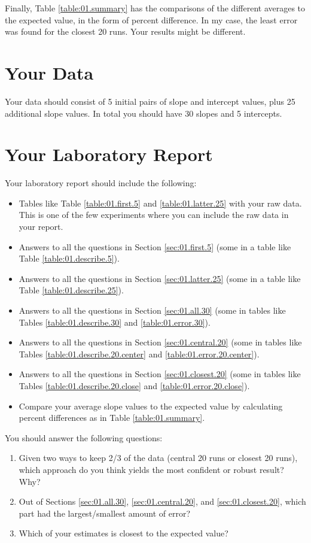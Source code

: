 Finally, Table \ref{table:01.summary} has the comparisons of the different averages to the expected value, in the form of percent difference. In my case, the least error was found for the closest 20 runs. Your results might be different.
%
\section{Your Data}
%
Your data should consist of 5 initial pairs of slope and intercept values, plus 25 additional slope values. In total you should have 30 slopes and 5 intercepts.
%
\newpage
\section{Your Laboratory Report}
%
Your laboratory report should include the following:
\begin{itemize}
    \item Tables like Table \ref{table:01.first.5} and \ref{table:01.latter.25} with your raw data. This is one of the few experiments where you can include the raw data in your report.
    \item Answers to all the questions in Section \ref{sec:01.first.5} (some in a table like Table \ref{table:01.describe.5}).
    \item Answers to all the questions in Section \ref{sec:01.latter.25} (some in a table like Table \ref{table:01.describe.25}).
    \item Answers to all the questions in Section \ref{sec:01.all.30} (some in tables like Tables \ref{table:01.describe.30} and \ref{table:01.error.30}).
    \item Answers to all the questions in Section \ref{sec:01.central.20} (some in tables like Tables \ref{table:01.describe.20.center} and \ref{table:01.error.20.center}).
    \item Answers to all the questions in Section \ref{sec:01.closest.20} (some in tables like Tables \ref{table:01.describe.20.close} and \ref{table:01.error.20.close}).
    \item Compare your average slope values to the expected value by calculating percent differences as in Table \ref{table:01.summary}.
\end{itemize}
You should answer the following questions:
\begin{enumerate}
    \item Given two ways to keep 2/3 of the data (central 20 runs or closest 20 runs), which approach do you think yields the most confident or robust result? Why?
    \item Out of Sections \ref{sec:01.all.30}, \ref{sec:01.central.20}, and \ref{sec:01.closest.20}, which part had the largest/smallest amount of error?
    \item Which of your estimates is closest to the expected value?
\end{enumerate}
%
\newpage
